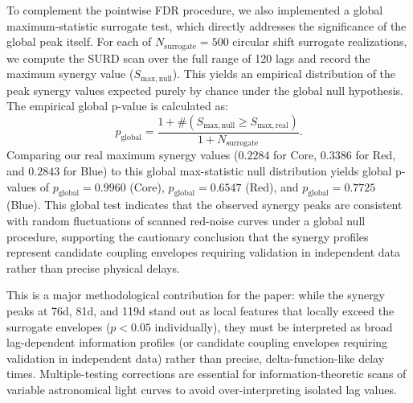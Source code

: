\documentclass[fleqn,usenatbib]{mnras}
\begin{document}
To complement the pointwise FDR procedure, we also implemented a global maximum-statistic surrogate test, which directly addresses the significance of the global peak itself. For each of $N_{\mathrm{surrogate}} = 500$ circular shift surrogate realizations, we compute the SURD scan over the full range of 120 lags and record the maximum synergy value ($S_{\mathrm{max, null}}$). This yields an empirical distribution of the peak synergy values expected purely by chance under the global null hypothesis. The empirical global p-value is calculated as:
\begin{equation}
p_{\mathrm{global}} = \frac{1 + \#(S_{\mathrm{max, null}} \ge S_{\mathrm{max, real}})}{1 + N_{\mathrm{surrogate}}}.
\end{equation}
Comparing our real maximum synergy values ($0.2284$ for Core, $0.3386$ for Red, and $0.2843$ for Blue) to this global max-statistic null distribution yields global p-values of $p_{\mathrm{global}} = 0.9960$ (Core), $p_{\mathrm{global}} = 0.6547$ (Red), and $p_{\mathrm{global}} = 0.7725$ (Blue). This global test indicates that the observed synergy peaks are consistent with random fluctuations of scanned red-noise curves under a global null procedure, supporting the cautionary conclusion that the synergy profiles represent candidate coupling envelopes requiring validation in independent data rather than precise physical delays.

This is a major methodological contribution for the paper: while the synergy peaks at 76d, 81d, and 119d stand out as local features that locally exceed the surrogate envelopes ($p < 0.05$ individually), they must be interpreted as broad lag-dependent information profiles (or candidate coupling envelopes requiring validation in independent data) rather than precise, delta-function-like delay times. Multiple-testing corrections are essential for information-theoretic scans of variable astronomical light curves to avoid over-interpreting isolated lag values.
\end{document}
